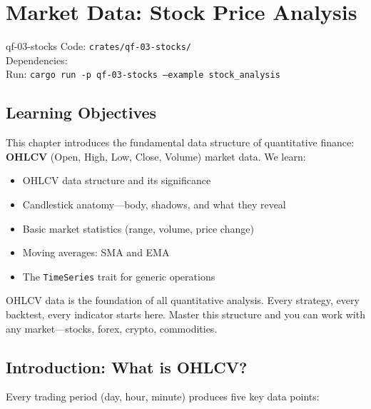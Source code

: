 \chapter{Market Data: Stock Price Analysis}
\label{ch:stocks}

\begin{companioncode}{qf-03-stocks}
Code: \texttt{crates/qf-03-stocks/}\\
Dependencies: \\
Run: \texttt{cargo run -p qf-03-stocks --example stock\_analysis}
\end{companioncode}

\section{Learning Objectives}

This chapter introduces the fundamental data structure of quantitative finance:
\textbf{OHLCV} (Open, High, Low, Close, Volume) market data. We learn:

\begin{itemize}
    \item OHLCV data structure and its significance
    \item Candlestick anatomy---body, shadows, and what they reveal
    \item Basic market statistics (range, volume, price change)
    \item Moving averages: SMA and EMA
    \item The \texttt{TimeSeries} trait for generic operations
\end{itemize}

\begin{keyinsight}
OHLCV data is the foundation of all quantitative analysis. Every strategy,
every backtest, every indicator starts here. Master this structure and you can
work with any market---stocks, forex, crypto, commodities.
\end{keyinsight}

\section{Introduction: What is OHLCV?}


Every trading period (day, hour, minute) produces five key data points:

